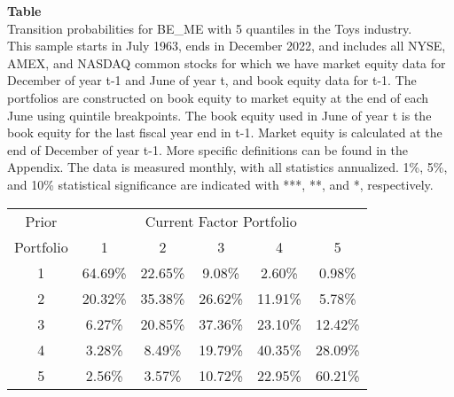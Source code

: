 \begin{table*}[ht!]
\raggedright
{}
\label{tab: transition_probs_BE_ME_Toys_with_5_quantiles}
\textbf{Table \thetable} \\
Transition probabilities for BE_ME with 5 quantiles in the Toys industry. \\
\hspace*{1em}This sample starts in July 1963, ends in December 2022, and includes all NYSE, AMEX, and NASDAQ common stocks for which we have market equity data for December of year t-1 and June of year t, and book equity data for t-1. The portfolios are constructed on book equity to market equity at the end of each June using quintile breakpoints.  The book equity used in June of year t is the book equity for the last fiscal year end in t-1.  Market equity is calculated at the end of December of year t-1.  More specific definitions can be found in the Appendix.  The data is measured monthly, with all statistics annualized.  1\%, 5\%, and 10\% statistical significance are indicated with ***, **, and *, respectively. \\
\vspace{0.5em}
\centering
\begin{adjustbox}{max width=\textwidth}
\begin{tabular}{@{}cccccc@{}}
\toprule
Prior & \multicolumn{5}{c}{Current Factor Portfolio} \\
Portfolio & 1 & 2 & 3 & 4 & 5 \\
\midrule
1 & 64.69\% & 22.65\% & 9.08\% & 2.60\% & 0.98\% \\
2 & 20.32\% & 35.38\% & 26.62\% & 11.91\% & 5.78\% \\
3 & 6.27\% & 20.85\% & 37.36\% & 23.10\% & 12.42\% \\
4 & 3.28\% & 8.49\% & 19.79\% & 40.35\% & 28.09\% \\
5 & 2.56\% & 3.57\% & 10.72\% & 22.95\% & 60.21\% \\
\bottomrule
\end{tabular}
\end{adjustbox}
\end{table*}